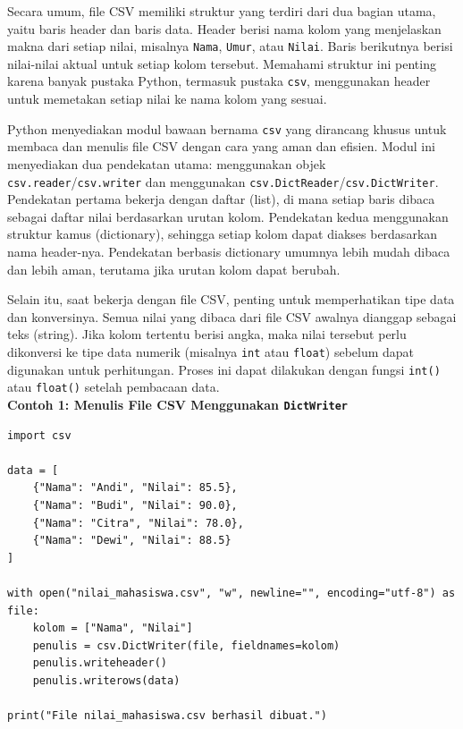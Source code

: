 Secara umum, file CSV memiliki struktur yang terdiri dari dua bagian utama, yaitu baris header dan baris data. Header berisi nama kolom yang menjelaskan makna dari setiap nilai, misalnya \texttt{Nama}, \texttt{Umur}, atau \texttt{Nilai}. Baris berikutnya berisi nilai-nilai aktual untuk setiap kolom tersebut. Memahami struktur ini penting karena banyak pustaka Python, termasuk pustaka \texttt{csv}, menggunakan header untuk memetakan setiap nilai ke nama kolom yang sesuai.

Python menyediakan modul bawaan bernama \texttt{csv} yang dirancang khusus untuk membaca dan menulis file CSV dengan cara yang aman dan efisien. Modul ini menyediakan dua pendekatan utama: menggunakan objek \texttt{csv.reader}/\texttt{csv.writer} dan menggunakan \texttt{csv.DictReader}/\texttt{csv.DictWriter}. Pendekatan pertama bekerja dengan daftar (list), di mana setiap baris dibaca sebagai daftar nilai berdasarkan urutan kolom. Pendekatan kedua menggunakan struktur kamus (dictionary), sehingga setiap kolom dapat diakses berdasarkan nama header-nya. Pendekatan berbasis dictionary umumnya lebih mudah dibaca dan lebih aman, terutama jika urutan kolom dapat berubah.

Selain itu, saat bekerja dengan file CSV, penting untuk memperhatikan tipe data dan konversinya. Semua nilai yang dibaca dari file CSV awalnya dianggap sebagai teks (string). Jika kolom tertentu berisi angka, maka nilai tersebut perlu dikonversi ke tipe data numerik (misalnya \texttt{int} atau \texttt{float}) sebelum dapat digunakan untuk perhitungan. Proses ini dapat dilakukan dengan fungsi \texttt{int()} atau \texttt{float()} setelah pembacaan data.\\

\noindent\textbf{Contoh 1: Menulis File CSV Menggunakan \texttt{DictWriter}}

\begin{lstlisting}[style=PythonStyle, caption={Menulis data ke file CSV menggunakan csv.DictWriter}, label={lst:b7-menulis-data-ke-file-csv-menggunakan}]
import csv

data = [
    {"Nama": "Andi", "Nilai": 85.5},
    {"Nama": "Budi", "Nilai": 90.0},
    {"Nama": "Citra", "Nilai": 78.0},
    {"Nama": "Dewi", "Nilai": 88.5}
]

with open("nilai_mahasiswa.csv", "w", newline="", encoding="utf-8") as file:
    kolom = ["Nama", "Nilai"]
    penulis = csv.DictWriter(file, fieldnames=kolom)
    penulis.writeheader()
    penulis.writerows(data)

print("File nilai_mahasiswa.csv berhasil dibuat.")
\end{lstlisting}

